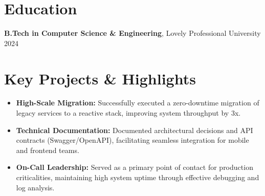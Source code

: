 \documentclass[a4paper,10pt]{article}
\begin{document}
\section*{Education}
\textbf{B.Tech in Computer Science \& Engineering}, Lovely Professional University \hfill 2024

\section*{Key Projects \& Highlights}
\begin{itemize}[leftmargin=*, itemsep=2pt]
    \item \textbf{High-Scale Migration:} Successfully executed a zero-downtime migration of legacy services to a reactive stack, improving system throughput by 3x.
    \item \textbf{Technical Documentation:} Documented architectural decisions and API contracts (Swagger/OpenAPI), facilitating seamless integration for mobile and frontend teams.
    \item \textbf{On-Call Leadership:} Served as a primary point of contact for production criticalities, maintaining high system uptime through effective debugging and log analysis.
\end{itemize}
\end{document}
